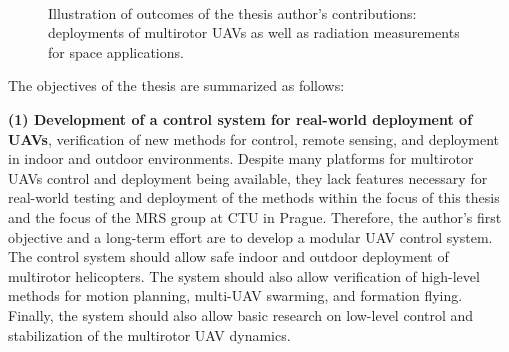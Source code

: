 \documentclass[a4paper,11pt,twoside,openright]{book}
\begin{document}
\begin{figure}[!hb]
{  }\\
  \vspace{-0.3em}
  \caption{Illustration of outcomes of the thesis author's contributions: deployments of multirotor \acp{UAV} as well as radiation measurements for space applications.}
  \label{fig:collage}
\end{figure}


The objectives of the thesis are summarized as follows:

\textbf{(1) Development of a control system for real-world deployment of \acp{UAV}}, verification of new methods for control, remote sensing, and deployment in indoor and outdoor environments.
Despite many platforms for multirotor \acp{UAV} control and deployment being available, they lack features necessary for real-world testing and deployment of the methods within the focus of this thesis and the focus of the \acl{MRS} group at \ac{CTU} in Prague.
Therefore, the author's first objective and a long-term effort are to develop a modular \ac{UAV} control system.
The control system should allow safe indoor and outdoor deployment of multirotor helicopters.
The system should also allow verification of high-level methods for motion planning, multi-\ac{UAV} swarming, and formation flying.
Finally, the system should also allow basic research on low-level control and stabilization of the multirotor \ac{UAV} dynamics.
\end{document}
